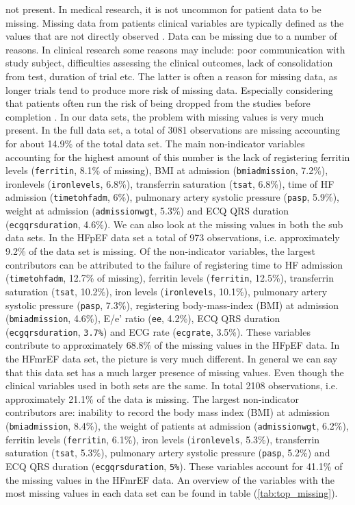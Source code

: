 \documentclass[../thesis.tex]{subfiles}
\begin{document}
\noindent not present. In medical research, it is not uncommon for patient data to be missing. Missing data from patients clinical variables are typically defined as the values that are not directly observed \citep{ibrahim2012missing}. Data can be missing due to a number of reasons. In clinical research some reasons may include: poor communication with study subject, difficulties assessing the clinical outcomes, lack of consolidation from test, duration of trial etc. The latter is often a reason for missing data, as longer trials tend to produce more risk of missing data. Especially considering that patients often run the risk of being dropped from the studies before completion \citep{myers2000handling}. In our data sets, the problem with missing values is very much present. In the full data set, a total of 3081 observations are missing accounting for about 14.9\% of the total data set. The main non-indicator variables accounting for the highest amount of this number is the lack of registering ferritin levels (\texttt{ferritin}, 8.1\% of missing), BMI at admission (\texttt{bmiadmission}, 7.2\%), ironlevels (\texttt{ironlevels}, 6.8\%), transferrin saturation (\texttt{tsat}, 6.8\%), time of HF admission (\texttt{timetohfadm}, 6\%), pulmonary artery systolic pressure (\texttt{pasp}, 5.9\%), weight at admission (\texttt{admissionwgt}, 5.3\%) and ECQ QRS duration (\texttt{ecgqrsduration}, 4.6\%). We can also look at the missing values in both the sub data sets. In the HFpEF data set a total of 973 observations, i.e. approximately 9.2\% of the data set is missing. Of the non-indicator variables, the largest contributors can be attributed to the failure of registering time to HF admission (\texttt{timetohfadm}, 12.7\% of missing), ferritin levels (\texttt{ferritin}, 12.5\%), transferrin saturation (\texttt{tsat}, 10.2\%), iron levels (\texttt{ironlevels}, 10.1\%), pulmonary artery systolic pressure (\texttt{pasp}, 7.3\%), registering body-mass-index (BMI) at admission (\texttt{bmiadmission}, 4.6\%), E/e' ratio (\texttt{ee}, 4.2\%), ECQ QRS duration (\texttt{ecgqrsduration}, \texttt{3.7\%}) and ECG rate (\texttt{ecgrate}, 3.5\%). These variables contribute to approximately 68.8\% of the missing values in the HFpEF data. In the HFmrEF data set, the picture is very much different. In general we can say that this data set has a much larger presence of missing values. Even though the clinical variables used in both sets are the same. In total 2108 observations, i.e. approximately 21.1\% of the data is missing. The largest non-indicator contributors are: inability to record the body mass index (BMI) at admission (\texttt{bmiadmission}, 8.4\%), the weight of patients at admission (\texttt{admissionwgt}, 6.2\%), ferritin levels (\texttt{ferritin}, 6.1\%), iron levels (\texttt{ironlevels}, 5.3\%), transferrin saturation (\texttt{tsat}, 5.3\%), pulmonary artery systolic pressure (\texttt{pasp}, 5.2\%) and ECQ QRS duration (\texttt{ecgqrsduration}, \texttt{5\%}). These variables account for 41.1\% of the missing values in the HFmrEF data. An overview of the variables with the most missing values in each data set can be found in table (\ref{tab:top_missing}).
\end{document}
